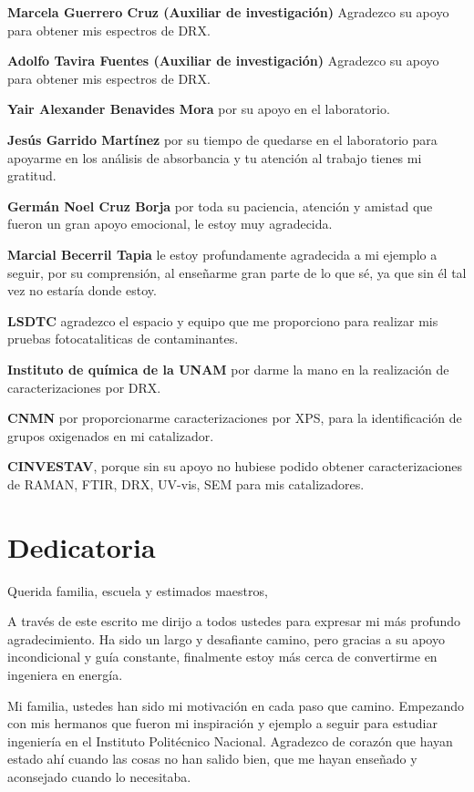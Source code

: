 \documentclass[12pt]{article}
\begin{document}
\textbf{Marcela Guerrero Cruz (Auxiliar de investigación)} Agradezco su apoyo para obtener mis espectros de DRX.

\textbf{Adolfo Tavira Fuentes (Auxiliar de investigación)} Agradezco su apoyo para obtener mis espectros de DRX.

\textbf{Yair Alexander Benavides Mora} por su apoyo en el laboratorio.

\textbf{Jesús Garrido Martínez} por su tiempo de quedarse en el laboratorio para apoyarme en los análisis de absorbancia y tu atención al trabajo tienes mi gratitud.

\textbf{Germán Noel Cruz Borja} por toda su paciencia, atención y amistad que fueron un gran apoyo emocional, le estoy muy agradecida.

\textbf{Marcial Becerril Tapia} le estoy profundamente agradecida a mi ejemplo a seguir, por su comprensión, al enseñarme gran parte de lo que sé, ya que sin él tal vez no estaría donde estoy.

\textbf{LSDTC} agradezco el espacio y equipo que me proporciono para realizar mis pruebas fotocataliticas de contaminantes.

\textbf{Instituto de química de la UNAM} por darme la mano en la realización de caracterizaciones por DRX.

\textbf{CNMN} por proporcionarme caracterizaciones por XPS, para la identificación de grupos oxigenados en mi catalizador.

\textbf{CINVESTAV}, porque sin su apoyo no hubiese podido obtener caracterizaciones de RAMAN, FTIR, DRX, UV-vis, SEM para mis catalizadores.





\newpage
\section*{Dedicatoria}
Querida familia, escuela y estimados maestros,

A través de este escrito me dirijo a todos ustedes para expresar mi más profundo agradecimiento. Ha sido un largo y desafiante camino, pero gracias a su apoyo incondicional y guía constante, finalmente estoy más cerca de convertirme en ingeniera en energía.\vspace{1em} %

Mi familia, ustedes han sido mi motivación en cada paso que camino.  Empezando con mis hermanos que fueron mi inspiración y ejemplo a seguir para estudiar ingeniería en el Instituto Politécnico Nacional. Agradezco de corazón que hayan estado ahí cuando las cosas no han salido bien, que me hayan enseñado y aconsejado cuando lo necesitaba.\vspace{1em} %
\end{document}
